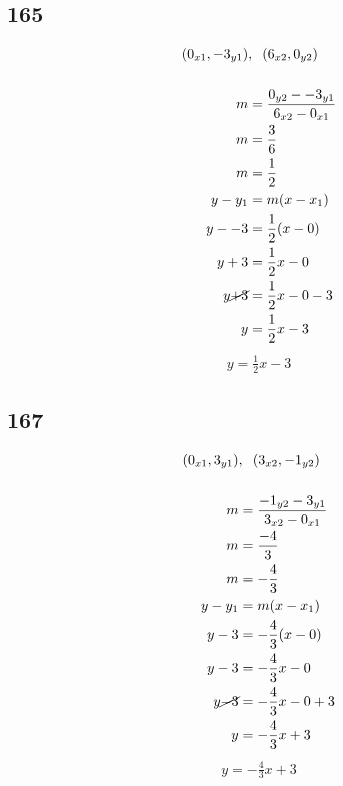 \documentclass{article}
\begin{document}
    \subsection*{165}
    \begin{align*}
    (0_{x1}, -3_{y1})&,\hspace{.2cm} (6_{x2}, 0_{y2}) \\
    \\
    m &= \frac{0_{y2} -  -3_{y1}}{6_{x2} - 0_{x1}} \\
    m &= \frac{3}{6} \\
    m &= \frac{1}{2}\\
    y - y_{1} &= m(x - x_{1})\\
    y - -3 &= \frac{1}{2}(x - 0) \\
    y +3 &= \frac{1}{2}x - 0\\
    y \cancel{+3} &= \frac{1}{2}x - 0 - 3\\
    y &= \frac{1}{2}x -3
    \end{align*}
    \begin{align*}
        \boxed{y = \frac{1}{2}x -3}
    \end{align*}

    \subsection*{167}
    \begin{align*}
    (0_{x1}, 3_{y1})&,\hspace{.2cm} (3_{x2}, -1_{y2}) \\
    \\
    m &= \frac{-1_{y2} -  3_{y1}}{3_{x2} - 0_{x1}} \\
    m &= \frac{-4}{3} \\
    m &= -\frac{4}{3}\\
    y - y_{1} &= m(x - x_{1})\\
    y - 3 &= -\frac{4}{3}(x - 0) \\
    y - 3 &= -\frac{4}{3}x - 0\\
    y \cancel{-3} &= -\frac{4}{3}x - 0 + 3\\
    y &= -\frac{4}{3}x +3
    \end{align*}
    \begin{align*}
        \boxed{y = -\frac{4}{3}x +3}
    \end{align*}
\end{document}
